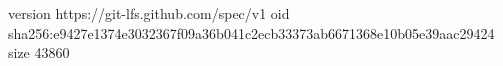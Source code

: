 version https://git-lfs.github.com/spec/v1
oid sha256:e9427e1374e3032367f09a36b041c2ecb33373ab6671368e10b05e39aac29424
size 43860
